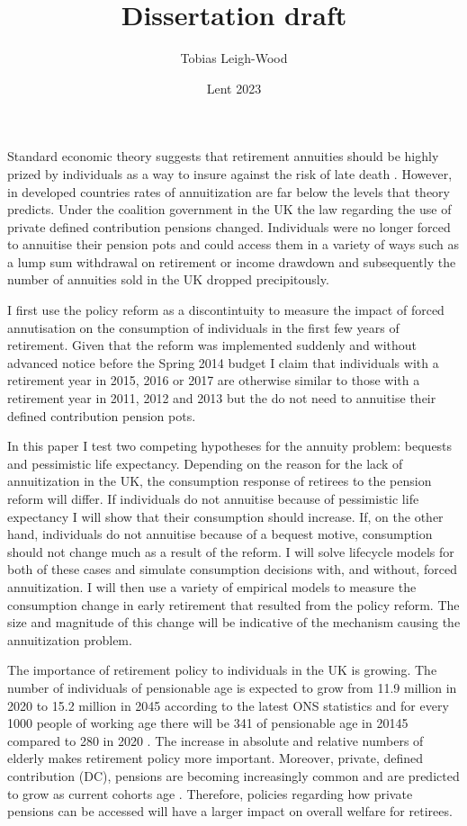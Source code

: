 \documentclass[12pt]{article}
\date{Lent 2023}
\title{Dissertation draft}
\author{Tobias Leigh-Wood}
\begin{document}
\maketitle


Standard economic theory suggests that retirement annuities should be highly prized by individuals as a way to
insure against the risk of late death \cite{yaari_65}. However, in developed countries rates of annuitization are far below the
levels that theory predicts.
Under the coalition government in the UK the law regarding the use of private defined
contribution pensions changed. Individuals were no longer forced to annuitise their pension pots and could access
them in a variety of ways such as a lump sum withdrawal on retirement or income drawdown and subsequently the number of annuities
sold in the UK dropped precipitously.

I first use the policy reform as a discontintuity to measure the impact of forced annutisation on the consumption
of individuals in the first few years of retirement. Given that the reform was implemented suddenly and without
advanced notice before the Spring 2014 budget I claim that individuals with a retirement year in 2015, 2016 or 2017
are otherwise similar to those with a retirement year in 2011, 2012 and 2013 but the do not need to annuitise their
defined contribution pension pots.


In this paper I test two competing hypotheses for the annuity problem: bequests and
pessimistic life expectancy. Depending on the reason for the lack of annuitization in the UK, the consumption response of retirees to the pension
reform will differ. If individuals do not annuitise because of pessimistic life expectancy I will show that their
consumption should increase. If, on the other hand, individuals do not annuitise because of a bequest motive, consumption
should not change much as a result of the reform. I will solve lifecycle models for both of these cases and simulate
consumption decisions with, and without, forced annuitization. I will then use a variety of empirical models to measure
the consumption change in early retirement that resulted from the policy reform. The size and magnitude of this change
will be indicative of the mechanism causing the annuitization problem.


The importance of retirement policy to individuals in the UK is growing. The number of individuals of
pensionable age is expected to grow from 11.9 million in 2020 to 15.2 million in
2045 according to the latest ONS statistics and for every 1000 people of working age there will be 341 of pensionable
age in 20145 compared to 280 in 2020 \cite{ons_population_predictions_2020}. The increase in absolute and relative
numbers of elderly makes retirement policy more important. Moreover, private, defined contribution (DC), pensions are
becoming increasingly common and are predicted to grow as current cohorts age \cite{cribb_karjalainen_ifs_2023}.
Therefore, policies regarding how private pensions can be accessed will have a larger impact on overall welfare for
retirees.
\end{document}
